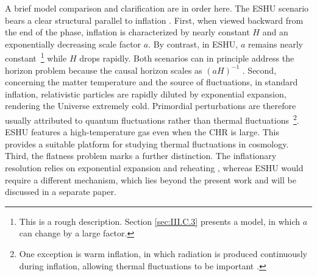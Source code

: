 \documentclass[aps,prd,twocolumn]{revtex4-2}
\begin{document}
A brief model comparison and clarification are in order here. The ESHU scenario bears a clear structural parallel to inflation \cite{Guth1981.PRD.23.347}. First, when viewed backward from the end of the phase, inflation is characterized by nearly constant $H$ and an exponentially decreasing scale factor $a$. By contrast, in ESHU, $a$ remains nearly constant~\footnote{This is a rough description. Section \ref{sec:III.C.3} presents a model, in which $a$ can change by a large factor.} while $H$ drops rapidly. Both scenarios can in principle address the horizon problem because the causal horizon scales as $(aH)^{-1}$ \cite{Baumann2009.arXiv.0907.5424}. Second, concerning the matter temperature and the source of fluctuations, in standard inflation, relativistic particles are rapidly diluted by exponential expansion, rendering the Universe extremely cold. Primordial perturbations are therefore usually attributed to quantum fluctuations rather than thermal fluctuations~\footnote{One exception is warm inflation, in which radiation is produced continuously during inflation, allowing thermal fluctuations to be important \cite{Berera1995.PRL.74.1912,Berera1995.PRL.75.3218}.}. ESHU features a high-temperature gas even when the CHR is large. This provides a suitable platform for studying thermal fluctuations in cosmology. Third, the flatness problem marks a further distinction. The inflationary resolution relies on exponential expansion and reheating \cite{Hu1994.PRD.49.3830}, whereas ESHU would require a different mechanism, which lies beyond the present work and will be discussed in a separate paper.
\end{document}
